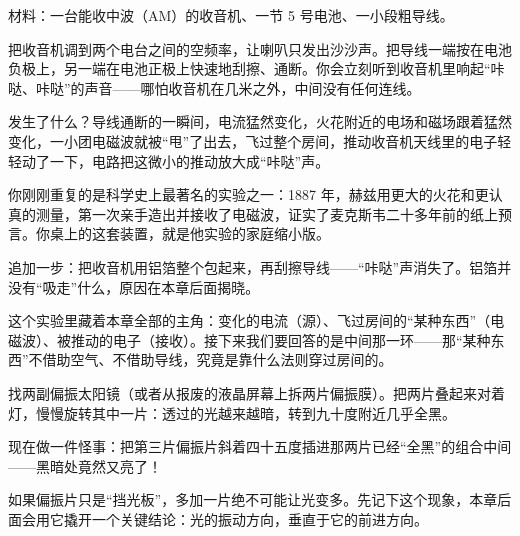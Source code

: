 
\begin{experiment}
材料：一台能收中波（AM）的收音机、一节 5 号电池、一小段粗导线。

把收音机调到两个电台之间的空频率，让喇叭只发出沙沙声。把导线一端按在电池负极上，另一端在电池正极上快速地刮擦、通断。你会立刻听到收音机里响起“咔哒、咔哒”的声音——哪怕收音机在几米之外，中间没有任何连线。

发生了什么？导线通断的一瞬间，电流猛然变化，火花附近的电场和磁场跟着猛然变化，一小团电磁波就被“甩”了出去，飞过整个房间，推动收音机天线里的电子轻轻动了一下，电路把这微小的推动放大成“咔哒”声。

你刚刚重复的是科学史上最著名的实验之一：1887 年，赫兹用更大的火花和更认真的测量，第一次亲手造出并接收了电磁波，证实了麦克斯韦二十多年前的纸上预言。你桌上的这套装置，就是他实验的家庭缩小版。

追加一步：把收音机用铝箔整个包起来，再刮擦导线——“咔哒”声消失了。铝箔并没有“吸走”什么，原因在本章后面揭晓。

这个实验里藏着本章全部的主角：变化的电流（源）、飞过房间的“某种东西”（电磁波）、被推动的电子（接收）。接下来我们要回答的是中间那一环——那“某种东西”不借助空气、不借助导线，究竟是靠什么法则穿过房间的。
\end{experiment}

\begin{experiment}[两片偏振片里的黑暗]
找两副偏振太阳镜（或者从报废的液晶屏幕上拆两片偏振膜）。把两片叠起来对着灯，慢慢旋转其中一片：透过的光越来越暗，转到九十度附近几乎全黑。

现在做一件怪事：把第三片偏振片斜着四十五度插进那两片已经“全黑”的组合中间——黑暗处竟然又亮了！

如果偏振片只是“挡光板”，多加一片绝不可能让光变多。先记下这个现象，本章后面会用它撬开一个关键结论：光的振动方向，垂直于它的前进方向。
\end{experiment}


